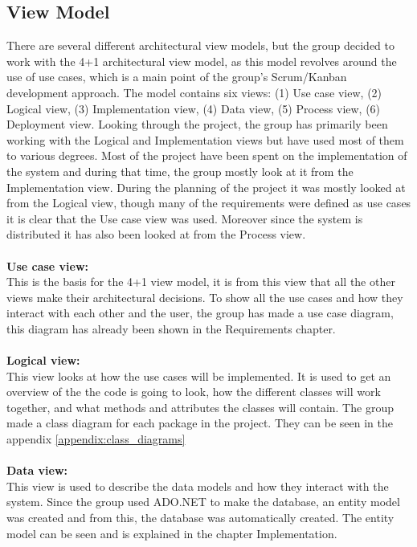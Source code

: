 \subsection{View Model}
There are several different architectural view models, but the group decided
to work with the 4+1 architectural view model, as this model revolves around
 the use of use cases, which is a main point of the group’s Scrum/Kanban
 development approach. The model contains six views: (1) Use case view, (2)
  Logical view, (3) Implementation view, (4) Data view, (5) Process view,
  (6) Deployment view. Looking through the project, the group has primarily
   been working with the Logical and Implementation views but have used most
   of them to various degrees. Most of the project have been spent on the
    implementation of the system and during that time, the group mostly look
    at it from the Implementation view. During the planning of the project
     it was mostly looked at from the Logical view, though many of the
     requirements were defined as use cases it is clear that the Use case
     view was used. Moreover since the system is distributed it has also
     been looked at from the Process view.
\\
\\
\textbf{Use case view:}
\\
This is the basis for the 4+1 view model, it is from this view that all the
 other views make their architectural decisions. To show all the use cases
 and how they interact with each other and the user, the group has made a use
  case diagram, this diagram has already been shown in the Requirements chapter.
\\
\\
\textbf{Logical view:}
\\
This view looks at how the use cases will be implemented. It is used to get
 an overview of the the code is going to look, how the different classes will
  work together, and what methods and attributes the classes will contain. The
   group made a class diagram for each package in the project. They can be
    seen in the appendix \ref{appendix:class_diagrams}
\\
\\
\textbf{Data view:}
\\
This view is used to describe the data models and how they interact with the
 system. Since the group used ADO.NET to make the database, an entity model
 was created and from this, the database was automatically created. The entity
  model can be seen and is explained in the chapter Implementation.
